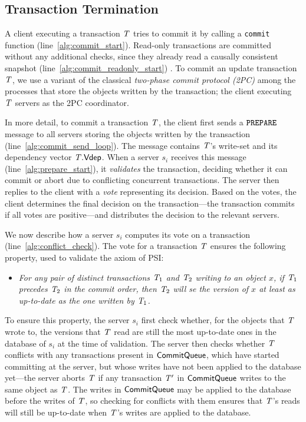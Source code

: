 
\subsection{Transaction Termination}

A client executing a transaction $\mathit{T}$ tries to commit it by calling a {\tt commit} function (line~\ref{alg:commit_start}). Read-only transactions are committed without any additional checks, since they already read a causally consistent snapshot (line~\ref{alg:commit_readonly_start}) . To commit an update transaction $\mathit{T}$, we use a variant of the classical \emph{two-phase commit protocol (2PC)}  among the processes that store the objects written by the transaction; the client executing $\mathit{T}$ servers as the 2PC coordinator.

In more detail, to commit a transaction $\mathit{T}$, the client first sends a ${\tt PREPARE}$ message to all servers storing the objects written by the transaction (line~\ref{alg:commit_send_loop}). The message contains $\mathit{T}$'s write-set and its dependency vector $\mathit{T}.\mathsf{Vdep}$. When a server $s_i$ receives this message (line~\ref{alg:prepare_start}), it \emph{validates} the transaction, deciding whether it can commit or abort due to conflicting concurrent transactions. The server then replies to the client with a \emph{vote} representing its decision. Based on the votes, the client determines the final decision on the transaction---the transaction commits if all votes are positive---and distributes the decision to the relevant servers.

We now describe how a server $s_i$ computes its vote on a transaction (line~\ref{alg:conflict_check}). The vote for a transaction $\mathit{T}$ ensures the following property, used to validate the \Wconflict axiom of PSI: 

\begin{itemize}
    \item \emph{For any pair of distinct transactions $\mathit{T}_1$ and $\mathit{T}_2$ writing to an object $x$, if $\mathit{T}_1$ precedes $\mathit{T}_2$ in the commit order, then $\mathit{T}_2$ will se the version of $x$ at least as up-to-date as the one written by $\mathit{T}_1$.}
\end{itemize}

To ensure this property, the server $s_i$ first check whether, for the objects that $\mathit{T}$ wrote to, the versions that $\mathit{T}$ read are still the most up-to-date ones in the database of $s_i$ at the time of validation. The server then checks whether $\mathit{T}$ conflicts with any transactions present in $\mathsf{CommitQueue}$, which have started committing at the server, but whose writes have not been applied to the database yet---the server aborts $\mathit{T}$ if any transaction $\mathit{T}'$ in $\mathsf{CommitQueue}$ writes to the same object as $\mathit{T}$. The writes in $\mathsf{CommitQueue}$ may be applied to the database before the writes of $\mathit{T}$, so checking for conflicts with them ensures that $\mathit{T}$'s reads will still be up-to-date when $\mathit{T}$'s writes are applied to the database.

